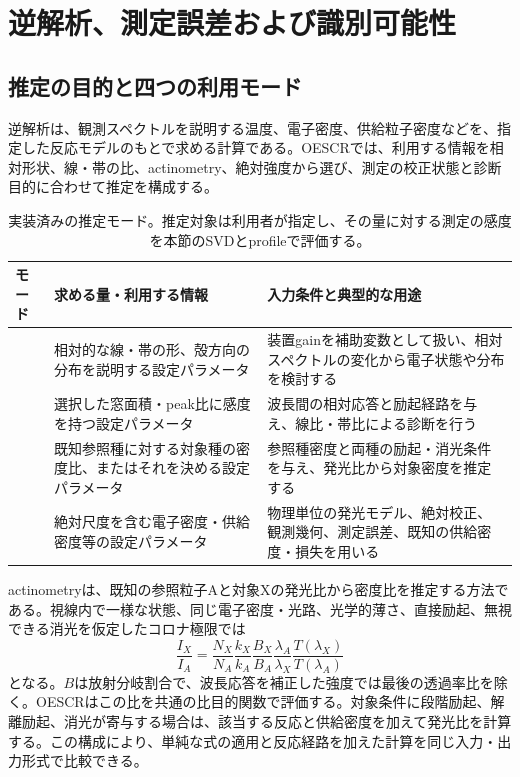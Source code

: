 \section{逆解析、測定誤差および識別可能性}
\subsection{推定の目的と四つの利用モード}
逆解析は、観測スペクトルを説明する温度、電子密度、供給粒子密度などを、指定した反応モデルのもとで求める計算である。OESCRでは、利用する情報を相対形状、線・帯の比、actinometry、絶対強度から選び、測定の校正状態と診断目的に合わせて推定を構成する。

\begin{table}[htbp]
\centering\small
\begin{tabularx}{\linewidth}{p{35mm}YY}
\toprule
モード & 求める量・利用する情報 & 入力条件と典型的な用途 \\
\midrule
{} & 相対的な線・帯の形、殻方向の分布を説明する設定パラメータ & 装置gainを補助変数として扱い、相対スペクトルの変化から電子状態や分布を検討する \\
 & 選択した窓面積・peak比に感度を持つ設定パラメータ & 波長間の相対応答と励起経路を与え、線比・帯比による診断を行う \\
 & 既知参照種に対する対象種の密度比、またはそれを決める設定パラメータ & 参照種密度と両種の励起・消光条件を与え、発光比から対象密度を推定する \\
 & 絶対尺度を含む電子密度・供給密度等の設定パラメータ & 物理単位の発光モデル、絶対校正、観測幾何、測定誤差、既知の供給密度・損失を用いる \\
\bottomrule
\end{tabularx}
\caption{実装済みの推定モード。推定対象は利用者が指定し、その量に対する測定の感度を本節のSVDとprofileで評価する。}
\end{table}

actinometryは、既知の参照粒子Aと対象Xの発光比から密度比を推定する方法である\cite{coburn,fuller}。視線内で一様な状態、同じ電子密度・光路、光学的薄さ、直接励起、無視できる消光を仮定したコロナ極限では
\begin{equation}
\frac{I_X}{I_A}=\frac{N_X}{N_A}\frac{k_X}{k_A}
\frac{B_X}{B_A}\frac{\lambda_A}{\lambda_X}\frac{T(\lambda_X)}{T(\lambda_A)}
\label{eq:actino}
\end{equation}
となる。$B$は放射分岐割合で、波長応答を補正した強度では最後の透過率比を除く。OESCRはこの比を共通の比目的関数で評価する。対象条件に段階励起、解離励起、消光が寄与する場合は、該当する反応と供給密度を加えて発光比を計算する。この構成により、単純な式の適用と反応経路を加えた計算を同じ入力・出力形式で比較できる。

